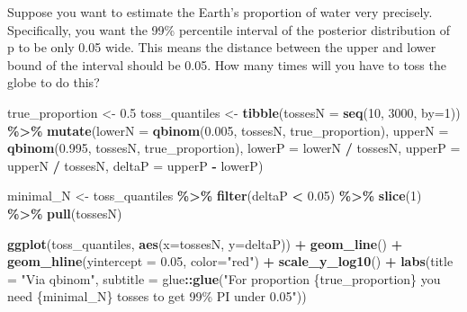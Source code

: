 \documentclass[
]{book}
\newenvironment{Shaded}{\begin{snugshade}}{\end{snugshade}}
\newcommand{\DataTypeTok}[1]{\textcolor[rgb]{0.13,0.29,0.53}{#1}}
\newcommand{\DecValTok}[1]{\textcolor[rgb]{0.00,0.00,0.81}{#1}}
\newcommand{\FloatTok}[1]{\textcolor[rgb]{0.00,0.00,0.81}{#1}}
\newcommand{\KeywordTok}[1]{\textcolor[rgb]{0.13,0.29,0.53}{\textbf{#1}}}
\newcommand{\NormalTok}[1]{#1}
\newcommand{\OperatorTok}[1]{\textcolor[rgb]{0.81,0.36,0.00}{\textbf{#1}}}
\newcommand{\StringTok}[1]{\textcolor[rgb]{0.31,0.60,0.02}{#1}}
\begin{document}
Suppose you want to estimate the Earth's proportion of water very precisely. Specifically, you want the 99\% percentile interval of the posterior distribution of p to be only 0.05 wide. This means the distance between the upper and lower bound of the interval should be 0.05. How many times will you have to toss the globe to do this?

\begin{Shaded}
\begin{Highlighting}[]
\NormalTok{true\_proportion \textless{}{-}}\StringTok{ }\FloatTok{0.5}
\NormalTok{toss\_quantiles \textless{}{-}}\StringTok{ }
\StringTok{  }\KeywordTok{tibble}\NormalTok{(}\DataTypeTok{tossesN =} \KeywordTok{seq}\NormalTok{(}\DecValTok{10}\NormalTok{, }\DecValTok{3000}\NormalTok{, }\DataTypeTok{by=}\DecValTok{1}\NormalTok{)) }\OperatorTok{\%\textgreater{}\%}
\StringTok{  }\KeywordTok{mutate}\NormalTok{(}\DataTypeTok{lowerN =} \KeywordTok{qbinom}\NormalTok{(}\FloatTok{0.005}\NormalTok{, tossesN, true\_proportion),}
         \DataTypeTok{upperN =} \KeywordTok{qbinom}\NormalTok{(}\FloatTok{0.995}\NormalTok{, tossesN, true\_proportion),}
         \DataTypeTok{lowerP =}\NormalTok{ lowerN }\OperatorTok{/}\StringTok{ }\NormalTok{tossesN,}
         \DataTypeTok{upperP =}\NormalTok{ upperN }\OperatorTok{/}\StringTok{ }\NormalTok{tossesN,}
         \DataTypeTok{deltaP =}\NormalTok{ upperP }\OperatorTok{{-}}\StringTok{ }\NormalTok{lowerP)}

\NormalTok{minimal\_N \textless{}{-}}\StringTok{ }
\StringTok{  }\NormalTok{toss\_quantiles }\OperatorTok{\%\textgreater{}\%}
\StringTok{  }\KeywordTok{filter}\NormalTok{(deltaP }\OperatorTok{\textless{}}\StringTok{ }\FloatTok{0.05}\NormalTok{) }\OperatorTok{\%\textgreater{}\%}
\StringTok{  }\KeywordTok{slice}\NormalTok{(}\DecValTok{1}\NormalTok{) }\OperatorTok{\%\textgreater{}\%}
\StringTok{  }\KeywordTok{pull}\NormalTok{(tossesN)}

\KeywordTok{ggplot}\NormalTok{(toss\_quantiles, }\KeywordTok{aes}\NormalTok{(}\DataTypeTok{x=}\NormalTok{tossesN, }\DataTypeTok{y=}\NormalTok{deltaP)) }\OperatorTok{+}\StringTok{ }
\StringTok{  }\KeywordTok{geom\_line}\NormalTok{() }\OperatorTok{+}\StringTok{ }
\StringTok{  }\KeywordTok{geom\_hline}\NormalTok{(}\DataTypeTok{yintercept =} \FloatTok{0.05}\NormalTok{, }\DataTypeTok{color=}\StringTok{"red"}\NormalTok{) }\OperatorTok{+}\StringTok{ }
\StringTok{  }\KeywordTok{scale\_y\_log10}\NormalTok{() }\OperatorTok{+}\StringTok{ }
\StringTok{  }\KeywordTok{labs}\NormalTok{(}\DataTypeTok{title =} \StringTok{"Via qbinom"}\NormalTok{,}
       \DataTypeTok{subtitle =}\NormalTok{ glue}\OperatorTok{::}\KeywordTok{glue}\NormalTok{(}\StringTok{"For proportion \{true\_proportion\} you need \{minimal\_N\} tosses to get 99\% PI under 0.05"}\NormalTok{))}
\end{Highlighting}
\end{Shaded}
\end{document}
